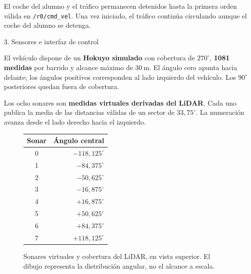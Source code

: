 \documentclass[11pt,a4paper]{article}
\newcommand{\problem}[1]{%
  \par\addvspace{4.2mm}%
  {\rmfamily\fontsize{16}{18}\selectfont\color{headingblue}#1\par}%
  \nobreak\vspace{1.6mm}\nobreak
}
\begin{document}
El coche del alumno y el tráfico permanecen detenidos hasta la primera
orden válida en \texttt{/r0/cmd\_vel}. Una vez iniciado, el tráfico
continúa circulando aunque el coche del alumno se detenga.

\newpage
\problem{3. Sensores e interfaz de control}

El vehículo dispone de un \textbf{Hokuyo simulado} con cobertura de
\textbf{$270^\circ$}, \textbf{1081 medidas} por barrido y alcance máximo
de \textbf{$30\ \mathrm{m}$}. El ángulo cero apunta hacia delante;
los ángulos positivos corresponden al lado izquierdo del vehículo.
Los $90^\circ$ posteriores quedan fuera de cobertura.

Los ocho sonares son \textbf{medidas virtuales derivadas del LiDAR}.
Cada uno publica la media de las distancias válidas de un sector de
$33{,}75^\circ$. La numeración avanza desde el lado derecho hacia el izquierdo.

\begin{figure}[!ht]
\centering
\begin{minipage}[c]{0.36\textwidth}
\centering
\begin{tabular}{@{}c r@{}}
\toprule
\textbf{Sonar} & \textbf{Ángulo central}\\
\midrule
0 & $-118{,}125^\circ$\\
1 & $-84{,}375^\circ$\\
2 & $-50{,}625^\circ$\\
3 & $-16{,}875^\circ$\\
4 & $+16{,}875^\circ$\\
5 & $+50{,}625^\circ$\\
6 & $+84{,}375^\circ$\\
7 & $+118{,}125^\circ$\\
\bottomrule
\end{tabular}
\end{minipage}
\hfill
\begin{minipage}[c]{0.58\textwidth}
\centering
{}
\end{minipage}
\caption{Sonares virtuales y cobertura del LiDAR, en vista superior.
El dibujo representa la distribución angular, no el alcance a escala.}
\end{figure}
\end{document}
